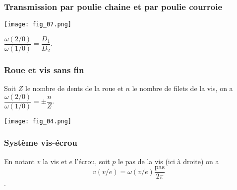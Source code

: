 \subsubsection{Transmission par poulie chaine et par poulie courroie}
\begin{table*}[!h]
\begin{minipage}[c]{.6\linewidth}
\begin{center}
\texttt{[image: fig\_07.png]}
\end{center}
\end{minipage}\hfill
\begin{minipage}[c]{.4\linewidth}
\begin{resultat}

$\dfrac{\omega(2/0)}{\omega(1/0)} = \dfrac{D_1}{D_2}$.
\end{resultat}
\end{minipage}
\end{table*}

\newpage

\subsubsection{Roue et vis sans fin}
\begin{table*}[!h]
\begin{minipage}[c]{.4\linewidth}
\begin{resultat}
Soit $Z$ le nombre de dents de la roue et $n$ le nombre de filets de la vis, on a 
$\dfrac{\omega(2/0)}{\omega(1/0)} = \pm \dfrac{n}{Z}$.
\end{resultat}
\end{minipage}\hfill
\begin{minipage}[c]{.6\linewidth}
\begin{center}
\texttt{[image: fig\_04.png]}
\end{center}
\end{minipage}
\end{table*}


\subsubsection{Système vis-écrou}
\begin{resultat}
En notant $v$ la vis et $e$ l'écrou, soit $p$ le pas de la vis (ici à droite) on a 
$$v(v/e)=\omega(v/e) \dfrac{\text{pas}}{2 \pi}$$.
\end{resultat}

